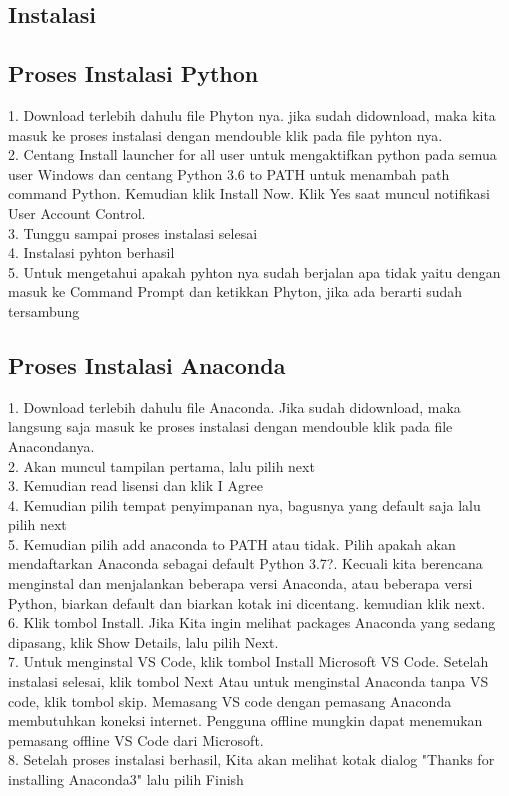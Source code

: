 \subsection{Instalasi}
\subsection{Proses Instalasi Python}
1. Download terlebih dahulu file Phyton nya. jika sudah didownload, maka kita masuk ke proses instalasi dengan mendouble klik pada file pyhton nya.\\
2. Centang Install launcher for all user untuk mengaktifkan python pada semua user Windows dan centang Python 3.6 to PATH untuk menambah path command Python. Kemudian klik Install Now. Klik Yes saat muncul notifikasi User Account Control. \\
3. Tunggu sampai proses instalasi selesai\\
4. Instalasi pyhton berhasil\\
5. Untuk mengetahui apakah pyhton nya sudah berjalan apa tidak yaitu dengan masuk ke Command Prompt dan ketikkan Phyton, jika ada berarti sudah tersambung\\

\subsection{Proses Instalasi Anaconda}
1. Download terlebih dahulu file Anaconda. Jika sudah didownload, maka langsung saja masuk ke proses instalasi dengan mendouble klik pada file Anacondanya.\\
2. Akan muncul tampilan pertama, lalu pilih next\\
3. Kemudian read lisensi dan klik I Agree\\
4. Kemudian pilih tempat penyimpanan nya, bagusnya yang default saja lalu pilih next\\
5. Kemudian pilih add anaconda to PATH atau tidak. Pilih apakah akan mendaftarkan Anaconda sebagai default Python 3.7?. Kecuali kita berencana menginstal dan menjalankan beberapa versi Anaconda, atau beberapa versi Python, biarkan default dan biarkan kotak ini dicentang. kemudian klik next.\\
6. Klik tombol Install. Jika Kita ingin melihat packages Anaconda yang sedang dipasang, klik Show Details, lalu pilih Next.\\
7. Untuk menginstal VS Code, klik tombol Install Microsoft VS Code. Setelah instalasi selesai, klik tombol Next Atau untuk menginstal Anaconda tanpa VS code, klik tombol skip. Memasang VS code dengan pemasang Anaconda membutuhkan koneksi internet. Pengguna offline mungkin dapat menemukan pemasang offline VS Code dari Microsoft.\\
8. Setelah proses instalasi berhasil, Kita akan melihat kotak dialog "Thanks for installing Anaconda3" lalu pilih Finish\\


